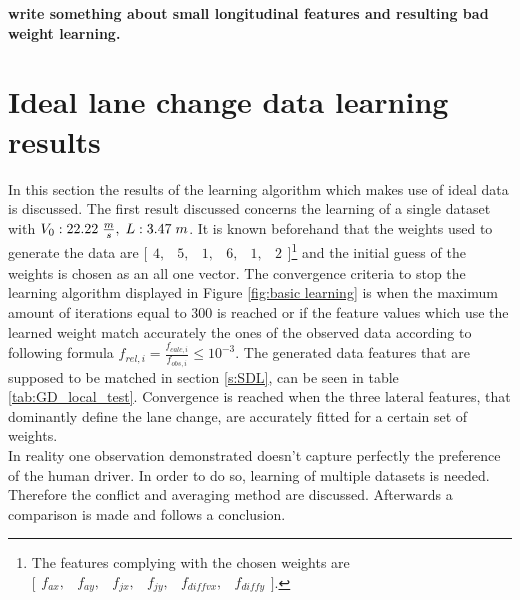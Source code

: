 \textbf{write something about small longitudinal features and resulting bad weight learning.}
\section{Ideal lane change data learning results} \label{s:ID_results}
In this section the results of the learning algorithm which makes use of ideal data is discussed. The first result discussed concerns the learning of a single dataset with $V_0:22.22\hspace{1mm}\frac{m}{s},\hspace{1mm} L:3.47\hspace{1mm}m$. It is known beforehand that the weights used to generate the data are  $\bigl[ \begin{smallmatrix} 4,&5,&1,&6,&1,&2\end{smallmatrix}\bigr]$\footnote{The features complying with the chosen weights are $\bigl[ \begin{smallmatrix} f_{ax},&f_{ay},&f_{jx},&f_{jy},&f_{diff vx},&f_{diff y}\end{smallmatrix}\bigr]$.} and the initial guess of the weights is chosen as an all one vector. The convergence criteria to stop the learning algorithm displayed in Figure \ref{fig:basic learning} is when the maximum amount of iterations equal to $300$ is reached or if the feature values which use the learned weight match accurately the ones of the observed data according to following formula $f_{rel,i} = \frac{f_{calc,i}}{f_{obs,i}} \leq 10^{-3}$. The generated data features that are supposed to be matched in section \ref{s:SDL}, can be seen in table \ref{tab:GD_local_test}. Convergence is reached when the three lateral features, that dominantly define the lane change, are accurately fitted for a certain set of weights.\\

In reality one observation demonstrated doesn't capture perfectly the preference of the human driver. In order to do so, learning of multiple datasets is needed. Therefore the conflict and averaging method are discussed. Afterwards a comparison is made and follows a conclusion.

